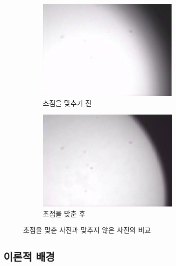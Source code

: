 \documentclass{abstract_hutech}
\begin{document}
\begin{figure}[h]
\begin{subfigure}{0.45\linewidth}
\centering
\includegraphics[width=1\linewidth]{before}
\caption{초점을 맞추기 전}
\label{fig:before}
\end{subfigure}
\begin{subfigure}{0.45\textwidth}
\centering
\includegraphics[width=1\linewidth]{after}
\caption{초점을 맞춘 후}
\label{fig:after}
\end{subfigure}
\caption{초점을 맞춘 사진과 맞추지 않은 사진의 비교}
\label{fig:before_after}
\end{figure}

\subsection{이론적 배경}
\end{document}
